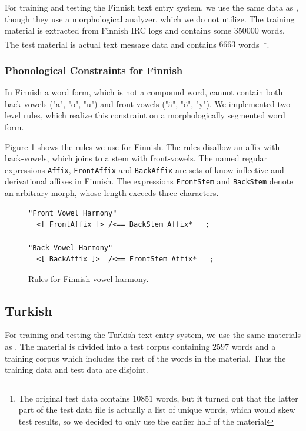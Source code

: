 \documentclass{llncs}
\begin{document}
For training and testing the Finnish text entry system, we use the
same data as \cite{silfverberg/2011/cla}, though they use a
morphological analyzer, which we do not utilize. The training material
is extracted from Finnish IRC logs and contains some 350000 words. The
test material is actual text message data and contains $6663$
words~\footnote{The original test data contains $10851$ words, but it
  turned out that the latter part of the test data file is actually a
  list of unique words, which would skew test results, so we decided
  to only use the earlier half of the material}.

\subsubsection{Phonological Constraints for Finnish}

In Finnish a word form, which is not a compound word, cannot contain
both back-vowels ("a", "o", "u") and front-vowels ("ä", "ö", "y"). We
implemented two-level rules, which realize this constraint on a
morphologically segmented word form.

Figure \ref{fi-constraints} shows the rules we use for Finnish. The
rules disallow an affix with back-vowels, which joins to a stem with
front-vowels. The named regular expressions \verb|Affix|,
\verb|FrontAffix| and \verb|BackAffix| are sets of know inflective and
derivational affixes in Finnish. The expressions \verb|FrontStem| and
\verb|BackStem| denote an arbitrary morph, whose length exceeds three
characters.

\begin{figure}
\begin{verbatim}
"Front Vowel Harmony"
  <[ FrontAffix ]> /<== BackStem Affix* _ ; 

"Back Vowel Harmony"
  <[ BackAffix ]>  /<== FrontStem Affix* _ ; 
\end{verbatim}
\caption{Rules for Finnish vowel harmony.}\label{fi-constraints}
\end{figure}

\subsection{Turkish}

For training and testing the Turkish text entry system, we use the
same materials as \cite{Tantug:2010}. The material is divided into a
test corpus containing $2597$ words and a training corpus which
includes the rest of the words in the material. Thus the training data
and test data are disjoint.
\end{document}
